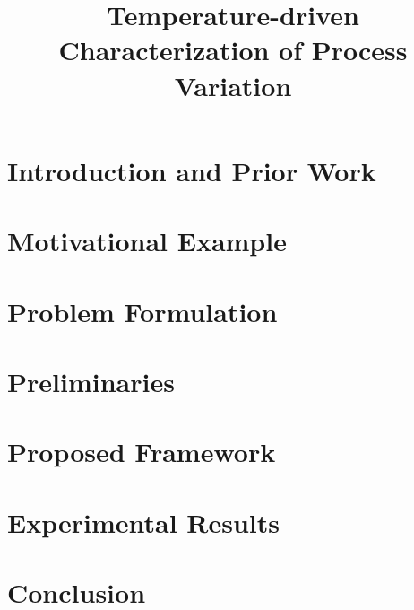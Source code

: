 \documentclass[9pt,conference]{IEEEtran}
\begin{document}
  \title{Temperature-driven Characterization of Process Variation}

  \author{
  }

  \maketitle

  \begin{abstract}
    
  \end{abstract}

  \section{Introduction and Prior Work} 
  

  \section{Motivational Example} 
  

  \section{Problem Formulation} 
  

  \section{Preliminaries}  
  

  \section{Proposed Framework} 
  

  \section{Experimental Results} 
  

  \section{Conclusion} 
  

  \begingroup
  \setlength\bibitemsep{2pt}
  \printbibliography
  \endgroup

  \appendix
  
\end{document}
